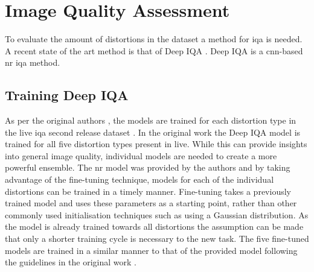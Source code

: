 \section{Image Quality Assessment}
To evaluate the amount of distortions in the dataset a method for \gls{iqa} is needed. A recent state of the art method is that of Deep IQA \cite{deepiqa}. Deep IQA is a \gls{cnn}-based \gls{nr} \gls{iqa} method.

\subsection{Training Deep IQA}
As per the original authors \cite{deepiqa}, the models are trained for each distortion type in the \gls{live} \gls{iqa} second release dataset \cite{livepaper} \cite{liveweb}. In the original work the Deep IQA model is trained for all five distortion types present in \gls{live}. While this can provide insights into general image quality, individual models are needed to create a more powerful ensemble. The \gls{nr} model was provided by the authors and by taking advantage of the fine-tuning technique, models for each of the individual distortions can be trained in a timely manner. Fine-tuning takes a previously trained model and uses these parameters as a starting point, rather than other commonly used initialisation techniques such as using a Gaussian distribution. As the model is already trained towards all distortions the assumption can be made that only a shorter training cycle is necessary to the new task. The five fine-tuned models are trained in a similar manner to that of the provided model following the guidelines in the original work \cite{deepiqa}. 
\\\\
